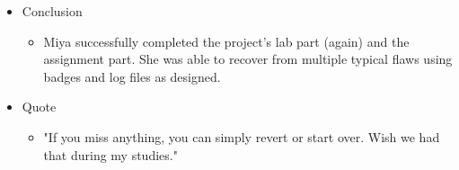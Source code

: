 \begin{itemize}
\item
  {Conclusion}
  \begin{itemize}
  \item
    {Miya successfully completed the project's lab part (again) and the assignment part. She was able to recover from multiple typical flaws using badges and log files as designed.}
  \end{itemize}

\item
  {Quote}
  \begin{itemize}
  \item
    {"If you miss anything, you can simply revert or start over. Wish we had that during my studies."}
  \end{itemize}
\end{itemize}
